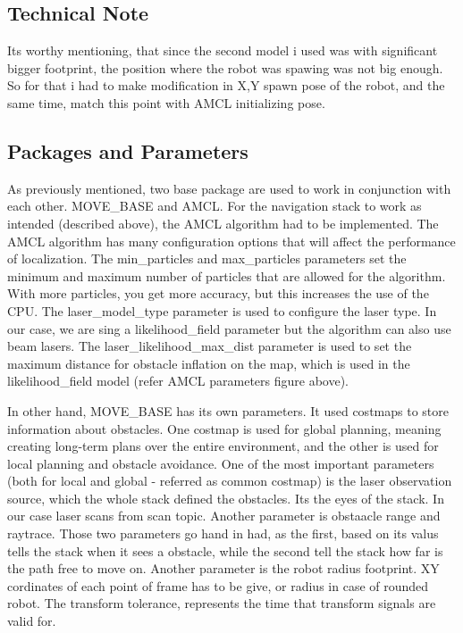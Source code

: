 \documentclass[10pt,journal,compsoc]{IEEEtran}
\begin{document}
    \subsection{Technical Note} %
    Its worthy mentioning, that since the second model i used was with significant bigger footprint, the position where the robot was spawing was not big enough. So for that i had to make modification in X,Y spawn pose of the robot, and the same time, match this point with AMCL initializing pose.
    
    \subsection{Packages and Parameters}
    As previously mentioned, two base package are used to work in conjunction with each other. MOVE\_BASE and AMCL. For the navigation stack to work as intended (described above), the AMCL algorithm had to be implemented. The AMCL algorithm has many configuration options that will affect the performance of localization. The min\_particles and max\_particles parameters set the minimum and maximum number of particles that are	allowed	for	the	algorithm. With	more particles, you get more accuracy, but this	increases the use of the CPU. The laser\_model\_type parameter is used to configure the laser type. In our	case, we are sing a	 likelihood\_field parameter but the algorithm can also use beam lasers. The laser\_likelihood\_max\_dist parameter is used to set the maximum distance for obstacle inflation on the	map, which is used	in	the	 likelihood\_field model (refer AMCL parameters figure above). 

    In other hand, MOVE\_BASE has its own parameters. It used costmaps to store information about obstacles. One costmap is used for global planning, meaning creating long-term plans over the entire environment, and the other is used for local planning and obstacle avoidance. One of the most important parameters (both for local and global - referred as common costmap) is the laser observation source, which the whole stack defined the obstacles. Its the eyes of the stack. In our case laser scans from scan topic. Another parameter is obstaacle range and raytrace. Those two parameters go hand in had, as the first, based on its valus tells the stack when it sees a obstacle, while the second tell the stack how far is the path free to move on. Another parameter is the robot radius footprint. XY cordinates of each point of frame has to be give, or radius in case of rounded robot. The transform tolerance, represents the time that transform signals are valid for.
   
\end{document}
